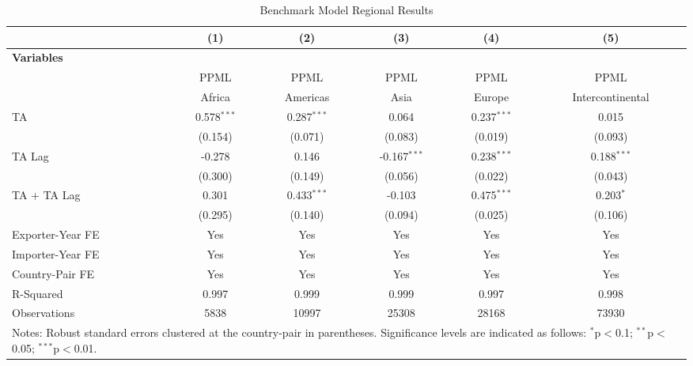 \begin{table}[htbp]
    \centering
    \caption{Benchmark Model Regional Results}
    \label{tab:benchmark_region_analysis} %
    \begin{adjustbox}{max width=\textwidth}
    \begin{tabular}{l@{\extracolsep{1pt}}ccccc}
    \hline
    & \multicolumn{1}{c}{(1)} & \multicolumn{1}{c}{(2)} & \multicolumn{1}{c}{(3)} & \multicolumn{1}{c}{(4)} & \multicolumn{1}{c}{(5)} \\
    \hline
    \textbf{Variables} &  &  &  &  &  \\
    \hline
     & PPML & PPML & PPML & PPML & PPML \\
     & Africa & Americas & Asia & Europe & Intercontinental \\
    \hline
    TA & 0.578$^{\ast\ast\ast}$ & 0.287$^{\ast\ast\ast}$ & 0.064 & 0.237$^{\ast\ast\ast}$ & 0.015 \\
    & (0.154) & (0.071) & (0.083) & (0.019) & (0.093) \\

    TA Lag & -0.278 & 0.146 & -0.167$^{\ast\ast\ast}$ & 0.238$^{\ast\ast\ast}$ & 0.188$^{\ast\ast\ast}$ \\
    & (0.300) & (0.149) & (0.056) & (0.022) & (0.043) \\

    TA + TA Lag & 0.301 & 0.433$^{\ast\ast\ast}$ & -0.103 & 0.475$^{\ast\ast\ast}$ & 0.203$^{\ast}$ \\
    & (0.295) & (0.140) & (0.094) & (0.025) & (0.106) \\
    \hline
    Exporter-Year FE & Yes & Yes & Yes & Yes & Yes \\
    Importer-Year FE & Yes & Yes & Yes & Yes & Yes \\
    Country-Pair FE & Yes & Yes & Yes & Yes & Yes \\
    R-Squared & 0.997 & 0.999 & 0.999 & 0.997 & 0.998 \\
    Observations & 5838 & 10997 & 25308 & 28168 & 73930 \\
    \hline
    \multicolumn{6}{l}{\footnotesize{Notes: Robust standard errors clustered at the country-pair in parentheses. Significance levels are indicated as follows: $^{\ast}$p$<$0.1; $^{\ast\ast}$p$<$0.05; $^{\ast\ast\ast}$p$<$0.01.}} \\
    \end{tabular}
    \end{adjustbox}
\end{table}    